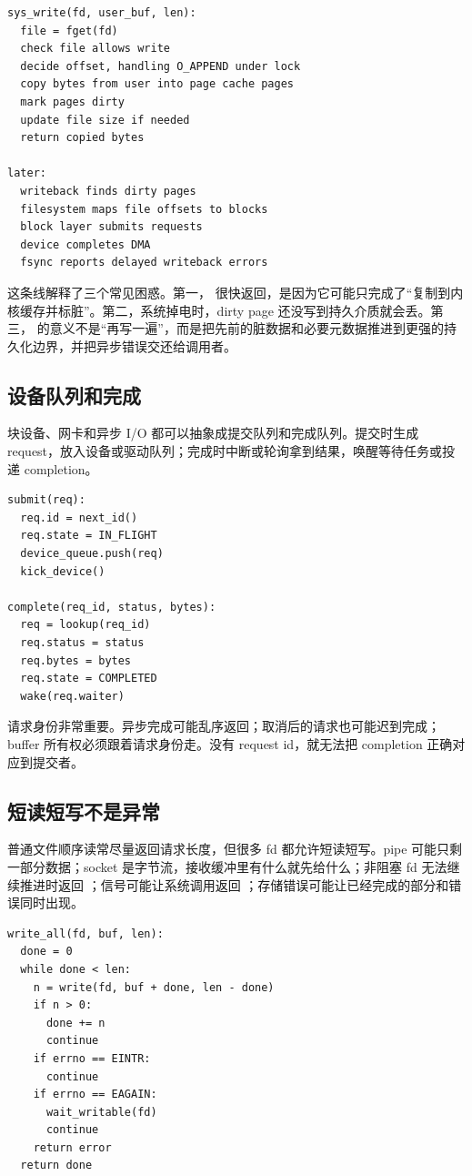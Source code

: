 \begin{lstlisting}
sys_write(fd, user_buf, len):
  file = fget(fd)
  check file allows write
  decide offset, handling O_APPEND under lock
  copy bytes from user into page cache pages
  mark pages dirty
  update file size if needed
  return copied bytes

later:
  writeback finds dirty pages
  filesystem maps file offsets to blocks
  block layer submits requests
  device completes DMA
  fsync reports delayed writeback errors
\end{lstlisting}

这条线解释了三个常见困惑。第一， 很快返回，是因为它可能只完成了“复制到内核缓存并标脏”。第二，系统掉电时，dirty page 还没写到持久介质就会丢。第三， 的意义不是“再写一遍”，而是把先前的脏数据和必要元数据推进到更强的持久化边界，并把异步错误交还给调用者。

\subsection{设备队列和完成}

块设备、网卡和异步 I/O 都可以抽象成提交队列和完成队列。提交时生成 request，放入设备或驱动队列；完成时中断或轮询拿到结果，唤醒等待任务或投递 completion。

\begin{lstlisting}
submit(req):
  req.id = next_id()
  req.state = IN_FLIGHT
  device_queue.push(req)
  kick_device()

complete(req_id, status, bytes):
  req = lookup(req_id)
  req.status = status
  req.bytes = bytes
  req.state = COMPLETED
  wake(req.waiter)
\end{lstlisting}

请求身份非常重要。异步完成可能乱序返回；取消后的请求也可能迟到完成；buffer 所有权必须跟着请求身份走。没有 request id，就无法把 completion 正确对应到提交者。

\subsection{短读短写不是异常}

普通文件顺序读常尽量返回请求长度，但很多 fd 都允许短读短写。pipe 可能只剩一部分数据；socket 是字节流，接收缓冲里有什么就先给什么；非阻塞 fd 无法继续推进时返回 ；信号可能让系统调用返回 ；存储错误可能让已经完成的部分和错误同时出现。

\begin{lstlisting}
write_all(fd, buf, len):
  done = 0
  while done < len:
    n = write(fd, buf + done, len - done)
    if n > 0:
      done += n
      continue
    if errno == EINTR:
      continue
    if errno == EAGAIN:
      wait_writable(fd)
      continue
    return error
  return done
\end{lstlisting}

